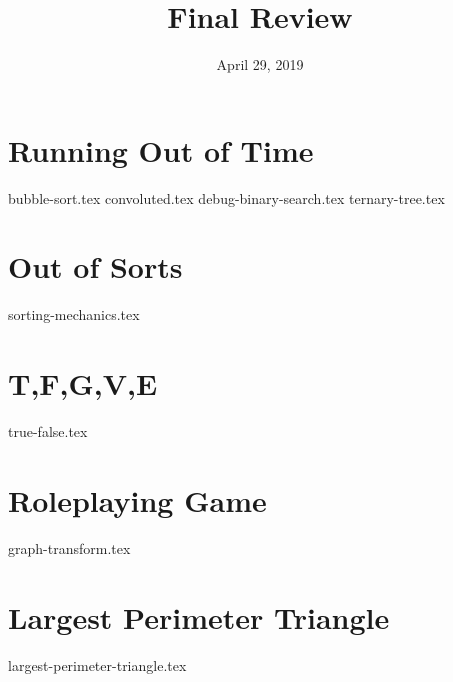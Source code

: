 \documentclass[11pt]{exam}
\title{Final Review}
\date{April 29, 2019}
\begin{document}
\maketitle

\section{Running Out of Time}
\begin{questions}
{bubble-sort.tex}
{convoluted.tex}
{debug-binary-search.tex}
{ternary-tree.tex}
\end{questions}

\pagebreak

\section{Out of Sorts}
\begin{questions}
{sorting-mechanics.tex}
\end{questions}

\pagebreak

\section{T,F,G,V,E}
\begin{questions}
{true-false.tex}
\end{questions}

\pagebreak

\section{Roleplaying Game}
\begin{questions}
{graph-transform.tex}
\end{questions}

\pagebreak

\section{Largest Perimeter Triangle}
\begin{questions}
{largest-perimeter-triangle.tex}
\end{questions}
\end{document}
